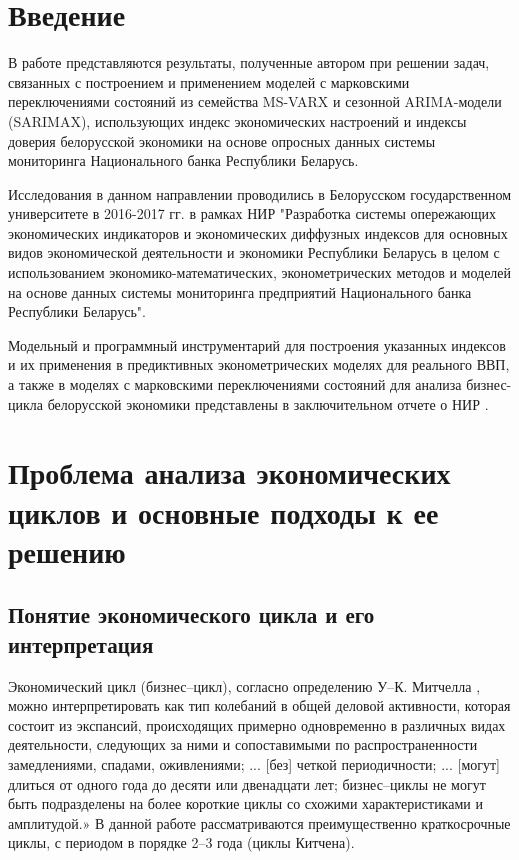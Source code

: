 \documentclass[../report.tex]{subfiles}
\begin{document}
	
	
	\chapter*{Введение}
	В работе представляются результаты, полученные автором при решении задач, связанных с построением и применением моделей с марковскими переключениями состояний из семейства MS-VARX и сезонной ARIMA-модели (SARIMAX), использующих индекс экономических настроений и индексы доверия белорусской экономики на основе опросных данных системы мониторинга Национального банка Республики Беларусь.
	
	Исследования в данном направлении проводились в Белорусском государственном университете в 2016-2017 гг. в рамках НИР "Разработка системы опережающих экономических индикаторов и экономических диффузных индексов для основных видов экономической деятельности и экономики Республики Беларусь в целом с использованием экономико-математических, эконометрических методов и моделей на основе данных системы мониторинга предприятий Национального банка Республики Беларусь".
	
	Модельный и программный инструментарий для построения указанных  индексов и их применения в предиктивных эконометрических моделях для реального ВВП, а также в моделях с марковскими переключениями состояний для анализа бизнес-цикла белорусской экономики представлены в заключительном отчете о НИР \cite{esiMaking}.
	
	
	
	\chapter{Проблема анализа экономических циклов и основные подходы к ее решению}
	
	\section{Понятие экономического цикла и его интерпретация}
	
	\iffalse
	
	Экономический цикл (бизнес–цикл), согласно определению У–К. Митчелла \cite{mitchellBS}, можно интерпретировать как тип колебаний в общей деловой активности, которая состоит из экспансий, происходящих примерно одновременно в различных видах деятельности, следующих за ними и сопоставимыми по распространенности замедлениями, спадами, оживлениями; ... [без] четкой периодичности; ... [могут] длиться от одного года до десяти или двенадцати лет; бизнес–циклы не могут быть подразделены на более короткие циклы со схожими характеристиками и амплитудой.»  В данной работе рассматриваются преимущественно краткосрочные циклы, с периодом в порядке 2–3 года (циклы Китчена).
	
\end{document}
